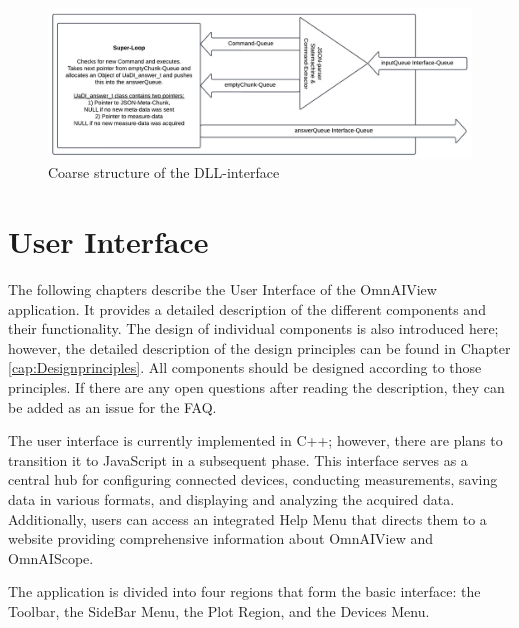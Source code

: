 \documentclass[]{scrreprt}
\begin{document}
\begin{figure}
    \includegraphics[width=.9\textwidth]{./assets/pictures/interface.pdf}
    \caption[]{Coarse structure of the DLL-interface}
    \label{fig:dllinterface}
\end{figure}





\section{User Interface}

The following chapters describe the User Interface of the OmnAIView application. It provides a detailed description of the different components and their functionality. The design of individual components is also introduced here; however, the detailed description of the design principles can be found in Chapter \ref{cap:Designprinciples}. All components should be designed according to those principles. If there are any open questions after reading the description, they can be added as an issue for the FAQ.

The user interface is currently implemented in C++; however, there are plans to transition it to JavaScript in a subsequent phase. This interface serves as a central hub for configuring connected devices, conducting measurements, saving data in various formats, and displaying and analyzing the acquired data. Additionally, users can access an integrated Help Menu that directs them to a website providing comprehensive information about OmnAIView and OmnAIScope.

The application is divided into four regions that form the basic interface: the Toolbar, the SideBar Menu, the Plot Region, and the Devices Menu.
\end{document}
